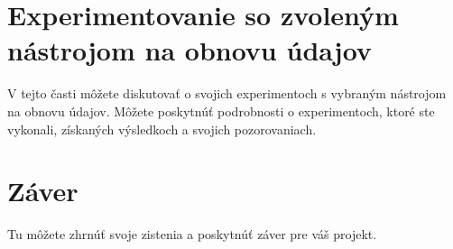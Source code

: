 \documentclass[12pt,oneside,slovak,a4paper]{article}
\begin{document}
\section{Experimentovanie so zvoleným nástrojom na obnovu údajov}
V tejto časti môžete diskutovať o svojich experimentoch s vybraným nástrojom na obnovu údajov. Môžete poskytnúť podrobnosti o experimentoch, ktoré ste vykonali, získaných výsledkoch a svojich pozorovaniach.

\section{Záver}
Tu môžete zhrnúť svoje zistenia a poskytnúť záver pre váš projekt.




\end{document}
